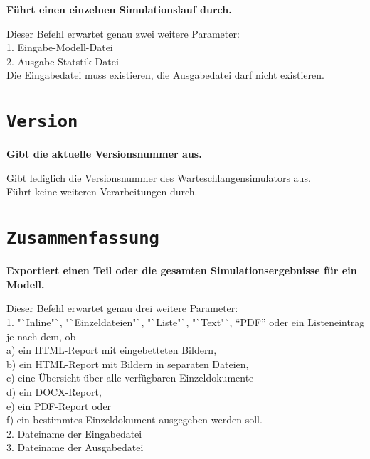 \textbf{Führt einen einzelnen Simulationslauf durch.}

Dieser Befehl erwartet genau zwei weitere Parameter:\\
1. Eingabe-Modell-Datei\\
2. Ausgabe-Statstik-Datei\\
Die Eingabedatei muss existieren, die Ausgabedatei darf nicht existieren.

\section{\texttt{Version}}

\textbf{Gibt die aktuelle Versionsnummer aus.}

Gibt lediglich die Versionsnummer des Warteschlangensimulators aus.\\
Führt keine weiteren Verarbeitungen durch.

\section{\texttt{Zusammenfassung}}

\textbf{Exportiert einen Teil oder die gesamten Simulationsergebnisse für ein Modell.}

Dieser Befehl erwartet genau drei weitere Parameter:\\
1. "`Inline"`, "`Einzeldateien"`, "`Liste"`, "`Text"`, "`PDF"' oder ein Listeneintrag je nach dem, ob\\
a) ein HTML-Report mit eingebetteten Bildern,\\
b) ein HTML-Report mit Bildern in separaten Dateien,\\
c) eine Übersicht über alle verfügbaren Einzeldokumente\\
d) ein DOCX-Report,\\
e) ein PDF-Report oder\\
f) ein bestimmtes Einzeldokument ausgegeben werden soll.\\
2. Dateiname der Eingabedatei\\
3. Dateiname der Ausgabedatei

